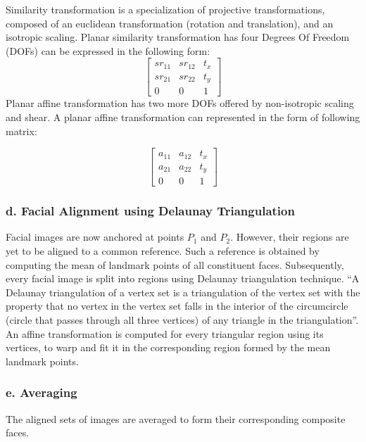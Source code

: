 \documentclass[../report.tex]{subfiles}
\begin{document}
    Similarity transformation \cite{hartley2003multiple} is a specialization of projective transformations, composed of an euclidean transformation (rotation and translation), and an isotropic scaling. Planar similarity transformation has four Degrees Of Freedom (DOFs) can be expressed in the following form:
    \begin{equation*}
    \begin{bmatrix}
    	sr_{11} & sr_{12} & t_{x} \\
    	sr_{21} & sr_{22} & t_{y} \\
    	0 & 0 & 1 
    \end{bmatrix} 
\end{equation*}
    Planar affine transformation has two more DOFs offered by non-isotropic scaling and shear. A planar affine transformation can represented in the form of following matrix:
    
    \begin{equation*}
    \begin{bmatrix}
    	a_{11} & a_{12} & t_{x} \\
    	a_{21} & a_{22} & t_{y} \\
    	0 & 0 & 1 
    \end{bmatrix}  
\end{equation*}
    \subsubsection{d. Facial Alignment using Delaunay Triangulation}
    Facial images are now anchored at points $P_{1}$ and $P_{2}$. However, their regions are yet to be aligned to a common reference. Such a reference is obtained by computing the mean of landmark points of all constituent faces. Subsequently, every facial image is split into regions using Delaunay triangulation technique. \enquote{A Delaunay triangulation of a vertex set is a triangulation of the vertex set with the property that no vertex in the vertex set falls in the interior of the circumcircle (circle that passes through all three vertices) of any triangle in the triangulation}\cite{cmu_triangle:_nodate}. An affine transformation is computed for every triangular region using its vertices, to warp and fit it in the corresponding region formed by the mean landmark points.
    
    \subsubsection{e. Averaging}
    The aligned sets of images are averaged to form their corresponding composite faces.
    
\end{document}
